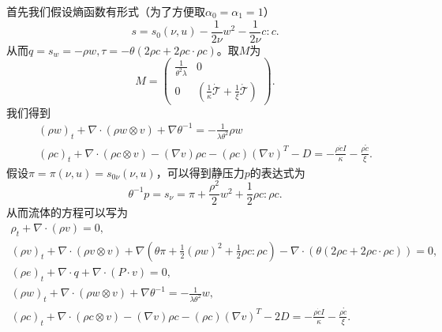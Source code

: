 	首先我们假设熵函数有形式（为了方便取$\alpha_0=\alpha_1=1$）
	\begin{equation*}
			s = s_0(\nu,u)  - \frac{1}{2 \nu } w^2 - \frac{1}{2  \nu } c:c.
	\end{equation*}
	从而$q=s_w=-{\rho w},\tau = - \theta (2 \rho c + 2 \rho c \cdot \rho c)$。取$M$为
	\begin{equation*}
		M = \left( \begin{array}{ccc} 
			\frac{1}{\theta^2 \lambda} & 0 \\
			0 &  (\frac{1}{\kappa}\dot{\mathcal{T}}  +  \frac{1}{\xi}\mathring{\mathcal{T}}  )
		\end{array} \right).
	\end{equation*}
	我们得到
\begin{eqnarray*}
			(\rho w)_t +  \nabla \cdot (\rho w \otimes v)  + \nabla \theta^{-1} = -\frac{1}{\lambda \theta^2}  \rho w \\
			(\rho c)_t +  \nabla \cdot (\rho c \otimes v) - (\nabla v) \rho c - (\rho c) (\nabla v)^T - D = - \frac{\rho \dot{c}I}{\kappa} -  \frac{\rho \mathring{c}}{\xi} .
\end{eqnarray*}
假设$\pi=\pi(\nu,u) = s_{0\nu}(\nu,u)$，可以得到静压力$p$的表达式为
\begin{equation*}
			\theta^{-1} p = s_\nu = \pi +\frac{\rho^2}{2} w^2 + \frac{1}{2} \rho c: \rho c.
\end{equation*}
从而流体的方程可以写为
\begin{subequations} \label{eq:ECDFsecond}
		\begin{align*}
			\rho_t + \nabla \cdot (\rho v) = 0 ,\\
			(\rho v)_t + \nabla \cdot (\rho v \otimes v) + \nabla (\theta\pi +\frac{1}{2} (\rho w)^2 + \frac{1}{2} \rho c: \rho c)  - \nabla \cdot (\theta (2 \rho c + 2 \rho c \cdot \rho c)) =0 ,\\
			(\rho e)_t + \nabla \cdot q + \nabla \cdot (P \cdot v) = 0, \\
			(\rho w)_t + \nabla \cdot (\rho w \otimes v) + \nabla \theta^{-1} = -\frac{1}{\lambda \theta^2} w, \\
			(\rho c)_t +  \nabla \cdot (\rho c \otimes v) - (\nabla v) \rho c - (\rho c) (\nabla v)^T - 2 D = - \frac{\rho \dot{c}I}{\kappa} -  \frac{\rho \mathring{c}}{\xi}  .
		\end{align*}
	\end{subequations}


